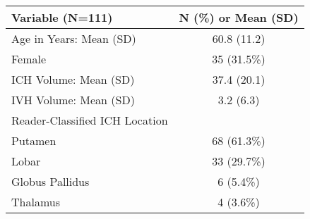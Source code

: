\begin{table}[ht]
\centering
\begin{tabular}{lc}
  \hline { Variable (N=111)} & { N (\%) or Mean (SD)} \\ 
  \hline
Age in Years: Mean (SD) & 60.8 (11.2) \\ 
   \hline
Female & 35 (31.5\%) \\ 
   \hline
ICH Volume: Mean (SD) & 37.4 (20.1) \\ 
   \hline
IVH Volume: Mean (SD) & 3.2 (6.3) \\ 
   \hline
Reader-Classified ICH Location &  \\ 
   \hline
\text{  } Putamen & 68 (61.3\%) \\ 
   \hline
\text{  } Lobar & 33 (29.7\%) \\ 
   \hline
\text{  } Globus Pallidus & 6 (5.4\%) \\ 
   \hline
\text{  } Thalamus & 4 (3.6\%) \\ 
   \hline
\end{tabular}
\caption{} 
\label{t:dem}
\end{table}
